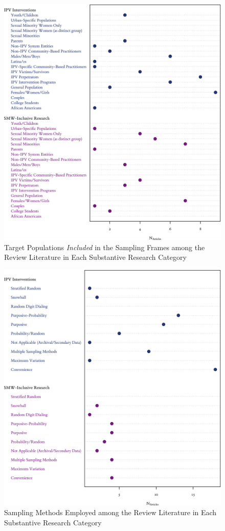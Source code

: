 \documentclass[11pt,]{tufte-book}
\begin{document}
\begin{figure}
\centering
\includegraphics{graphics/inputs/populations.png}
\caption{Target Populations \emph{Included} in the Sampling Frames among
the Review Literature in Each Substantive Research
Category\label{fig:populations}}
\end{figure}

\newpage

\begin{figure}
\centering
\includegraphics{graphics/inputs/sampling.png}
\caption{Sampling Methods Employed among the Review Literature in Each
Substantive Research Category\label{fig:sampling}}
\end{figure}
\end{document}
